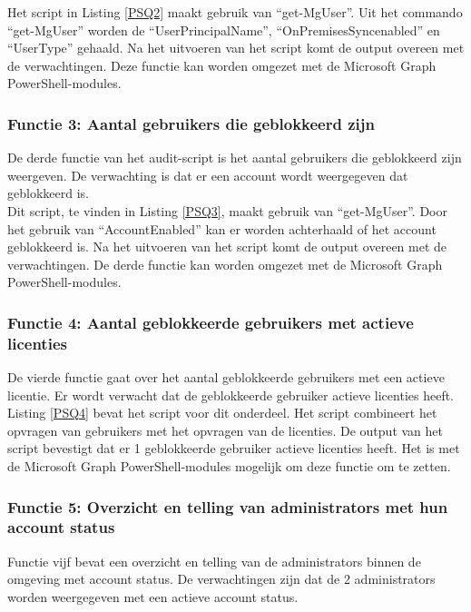 Het script in Listing \ref{PSQ2} maakt gebruik van “get-MgUser”. Uit het commando “get-MgUser” worden de “UserPrincipalName”, “OnPremisesSyncenabled” en “UserType” gehaald.  Na het uitvoeren van het script komt de output overeen met de verwachtingen. Deze functie kan worden omgezet met de Microsoft Graph PowerShell-modules. \\

\subsubsection{Functie 3: Aantal gebruikers die geblokkeerd zijn}

De derde functie van het audit-script is het aantal gebruikers die geblokkeerd zijn weergeven. De verwachting is dat er een account wordt weergegeven dat geblokkeerd is. \\

Dit script, te vinden in Listing \ref{PSQ3}, maakt gebruik van “get-MgUser”. Door het gebruik van “AccountEnabled” kan er worden achterhaald of het account geblokkeerd is. Na het uitvoeren van het script komt de output overeen met de verwachtingen. De derde functie kan worden omgezet met de Microsoft Graph PowerShell-modules. 

\subsubsection{Functie 4: Aantal geblokkeerde gebruikers met actieve licenties}

De vierde functie gaat over het aantal geblokkeerde gebruikers met een actieve licentie. Er wordt verwacht dat de geblokkeerde gebruiker actieve licenties heeft. \\

Listing \ref{PSQ4} bevat het script voor dit onderdeel. Het script combineert het opvragen van gebruikers met het opvragen van de licenties. De output van het script bevestigt dat er 1 geblokkeerde gebruiker actieve licenties heeft. Het is met de Microsoft Graph PowerShell-modules mogelijk om deze functie om te zetten.

\subsubsection{Functie 5: Overzicht en telling van administrators met hun account status}

Functie vijf bevat een overzicht en telling van de administrators binnen de omgeving met account status. De verwachtingen zijn dat de 2 administrators worden weergegeven met een actieve account status. \\

